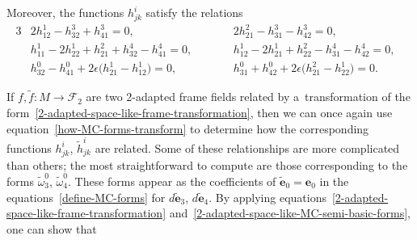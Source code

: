 \documentclass[pdftex]{sigma}
\numberwithin{equation}{section}
\theoremstyle{definition}
\begin{document}
Moreover, the functions $h^i_{jk}$ satisfy the relations
\begin{alignat}{3}
& 2 h^1_{12} - h^3_{32} + h^3_{41} = 0,
\qquad &&
2 h^2_{21} - h^3_{31} - h^3_{42} = 0,&
\nonumber
\\
& h^1_{11} - 2 h^1_{22} + h^2_{21} + h^4_{32} - h^4_{41} = 0,
\qquad &&
h^1_{12} - 2 h^1_{21} + h^2_{22} - h^4_{31} - h^4_{42} = 0,&
\nonumber
\\
& h^0_{32} - h^0_{41} + 2\epsilon\big(h^1_{21} - h^1_{12}\big) = 0,
\qquad &&
h^0_{31} + h^0_{42} + 2\epsilon\big(h^2_{21} - h^1_{22}\big) = 0.&
\label{2-adapted-space-like-h-relations}
\end{alignat}

If $f, \tilde{f}:M \to \mathcal{F}_2$ are two 2-adapted frame f\/ields related by a~transformation of the
form~\eqref{2-adapted-space-like-frame-transformation}, then we can once again use
equation~\eqref{how-MC-forms-transform} to determine how the corresponding functions $h^i_{jk}$, $\tilde{h}^i_{jk}$ are
related.
Some of these relationships are more complicated than others; the most straightforward to compute are those
corresponding to the forms $\tilde{\omega}^0_3$, $\tilde{\omega}^0_4$.
These forms appear as the coef\/f\/icients of $\tilde{\mathbf{e}}_0 = \mathbf{e}_0$ in the equations~\eqref{define-MC-forms}
for $d\tilde{\mathbf{e}}_3$, $d\tilde{\mathbf{e}}_4$.
By applying equations~\eqref{2-adapted-space-like-frame-transformation}
and~\eqref{2-adapted-space-like-MC-semi-basic-forms}, one can show that
\end{document}
